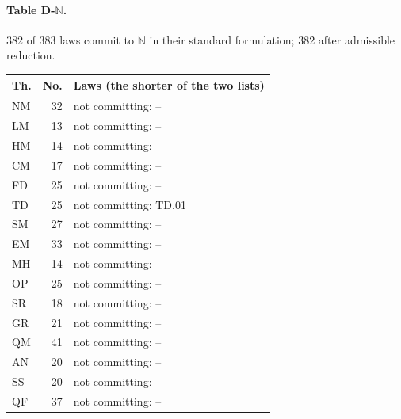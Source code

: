 \paragraph{Table D-$\mathbb N$.} 382 of 383 laws commit to $\mathbb N$ in their standard formulation; 382 after admissible reduction.
{\scriptsize\setlength{\tabcolsep}{3pt}
\begin{longtable}{l r p{12.2cm}}
\toprule
Th. & No. & Laws (the shorter of the two lists) \\
\midrule
\endhead
\bottomrule\endfoot
NM & 32 & not committing: -- \\
LM & 13 & not committing: -- \\
HM & 14 & not committing: -- \\
CM & 17 & not committing: -- \\
FD & 25 & not committing: -- \\
TD & 25 & not committing: TD.01 \\
SM & 27 & not committing: -- \\
EM & 33 & not committing: -- \\
MH & 14 & not committing: -- \\
OP & 25 & not committing: -- \\
SR & 18 & not committing: -- \\
GR & 21 & not committing: -- \\
QM & 41 & not committing: -- \\
AN & 20 & not committing: -- \\
SS & 20 & not committing: -- \\
QF & 37 & not committing: -- \\
\end{longtable}
}
